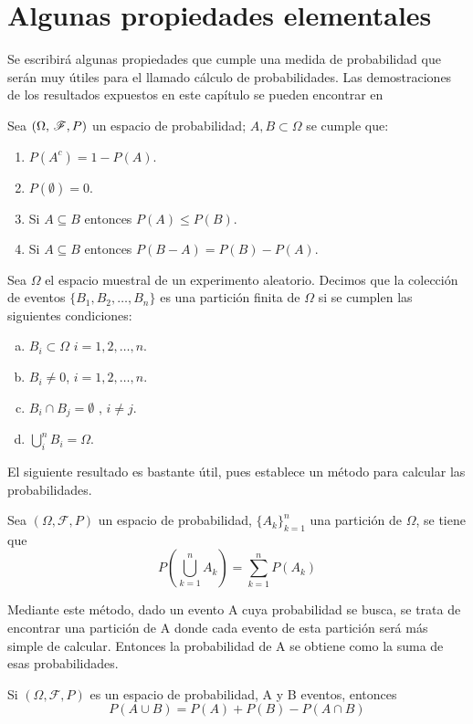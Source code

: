 \section{Algunas propiedades elementales}

Se escribirá algunas propiedades que cumple una medida de probabilidad que serán muy útiles para el llamado cálculo de probabilidades. Las demostraciones de los resultados expuestos en este capítulo se pueden encontrar en %
\begin{Prop}
    Sea $(\Omega,\thinspace\mathscr{F},P)$ un espacio de probabilidad; $A,B\subset\Omega$ se cumple que:
    \begin{enumerate}
        \item $P(A^c)=1-P(A)$.
        \item $P(\emptyset)=0$.
        \item Si $A\subseteq B$ entonces $P(A)\leq P(B)$.
        \item Si $A\subseteq B$ entonces $P(B-A)=P(B)-P(A)$.
    \end{enumerate}
    \end{Prop}
\begin{Def}
    Sea $\Omega$ el espacio muestral de un experimento aleatorio. Decimos que la colección de eventos $\{B_1,B_2,\ldots,B_n\}$ es una partición finita de $\Omega$ si se cumplen las siguientes condiciones:
    \begin{enumerate}[a)]
        \item $B_i\subset\Omega$ $i=1,2,\ldots,n$.
        \item $B_i\not=0$, $i=1,2,\ldots,n$.
        \item $B_i\cap B_j=\emptyset$ , $i\not= j$.
        \item $\bigcup_i^n B_i=\Omega$.
    \end{enumerate}
\end{Def}
El siguiente resultado es bastante útil, pues establece un método para calcular las probabilidades.
\begin{Prop}
    Sea $(\Omega,\mathscr{F},P)$ un espacio de probabilidad, $\{A_k\}_{k=1}^n$ una partición de $\Omega$, se tiene que
    $$P(\bigcup_{k=1}^n A_k)=\sum_{k=1}^n P(A_k)$$ 
\end{Prop}
Mediante este método, dado un evento A cuya probabilidad se busca, se trata de encontrar una partición de A donde cada evento de esta partición será más simple de calcular. Entonces la probabilidad de A se obtiene como la suma de esas probabilidades.
\begin{Cor}
    Si $(\Omega,\mathscr{F},P)$ es un espacio de probabilidad, A y B eventos, entonces
    $$P(A\cup B)=P(A)+P(B)-P(A\cap B)$$
\end{Cor}
